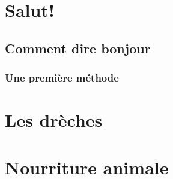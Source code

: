 \documentclass[11pt,a4paper]{article}
\begin{document}
%
%


%
%

\setcounter{page}{1}
\renewcommand*{\thepage}{\Roman{page}}

  
\newcommand{\sectionbreak}{\newpage}

%
%

%
%

\section{Salut!}
\subsection{Comment dire bonjour}
\subsubsection{Une première méthode}
\begin{itemize}
\end{itemize}

\iffalse

\renewcommand{\thesection}{\arabic{section}}
\setcounter{page}{1}
\setcounter{section}{0}
\section{Les drèches}
\label{sec:les-dreches}






\renewcommand{\currentColor}{vertforet}
\renewcommand{\sectionImage}{nourriture_animale.jpg}
\section{Nourriture animale}
\label{sec:nourriture-animale}
\renewcommand{\headersColor}{vertforet}







\end{document}
